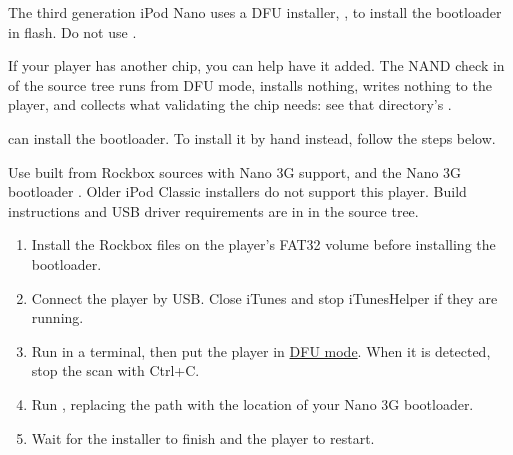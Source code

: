 The third generation iPod Nano uses a DFU installer, ,
to install the bootloader in flash. Do not use .


If your player has another chip, you can help have it added. The NAND check in  of the
source tree runs from DFU mode, installs nothing, writes nothing to the
player, and collects what validating the chip needs: see that
directory's .

 can install the bootloader. To install it by hand
instead, follow the steps below.

Use  built from Rockbox sources
with Nano 3G support, and the Nano 3G bootloader
. Older iPod Classic installers do not
support this player. Build instructions and USB driver requirements are
in  in the source tree.

\begin{enumerate}
\item Install the Rockbox files on the player's FAT32 volume before
installing the bootloader.
\item Connect the player by USB. Close iTunes and stop iTunesHelper if
they are running.
\item Run  in a terminal, then put the
player in
\href{https://freemyipod.org/wiki/Modes#DFU_mode}{DFU mode}.
When it is detected, stop the scan with Ctrl+C.
\item Run ,
replacing the path with the location of your Nano 3G bootloader.
\item Wait for the installer to finish and the player to restart.
\end{enumerate}
